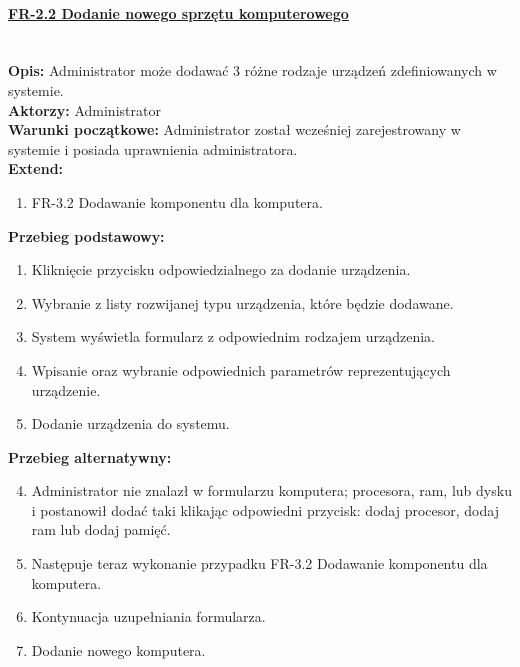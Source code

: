 \paragraph{\underline{FR-2.2 Dodanie nowego sprzętu komputerowego}}\mbox{}\\[1mm]
	\noindent\textbf{Opis:} Administrator może dodawać 3 różne rodzaje urządzeń zdefiniowanych w systemie.\\
	\noindent\textbf{Aktorzy:} Administrator\\
	\textbf{Warunki początkowe:} Administrator został wcześniej zarejestrowany w systemie i posiada uprawnienia administratora.\\
	\textbf{Extend:} 
	\begin{enumerate}[noparskip]
		\item FR-3.2 Dodawanie komponentu dla komputera.
	\end{enumerate}
	\textbf{Przebieg podstawowy:}
	\begin{enumerate}[noparskip]
		\item Kliknięcie przycisku odpowiedzialnego za dodanie urządzenia.
    \item Wybranie z listy rozwijanej typu urządzenia, które będzie dodawane.
		\item System wyświetla formularz z odpowiednim rodzajem urządzenia.
		\item Wpisanie oraz wybranie odpowiednich parametrów reprezentujących urządzenie.
		\item Dodanie urządzenia do systemu.	\end{enumerate} 
	\textbf{Przebieg alternatywny:}
	\begin{enumerate}[noparskip]\setcounter{enumi}{3}
		\item Administrator nie znalazł w formularzu komputera; procesora, ram, lub dysku i postanowił dodać taki klikając odpowiedni przycisk: dodaj procesor, dodaj ram lub dodaj pamięć.
		\item Następuje teraz wykonanie przypadku FR-3.2 Dodawanie komponentu dla komputera.
		\item Kontynuacja uzupełniania formularza.
		\item Dodanie nowego komputera.
	\end{enumerate} \mbox{}\\[-11mm]

